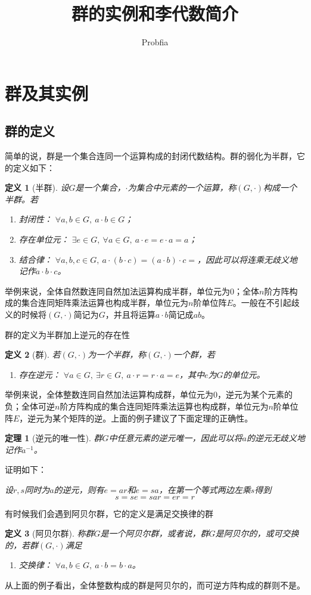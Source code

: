 \documentclass[a4paper,11pt]{ctexart}
\title{群的实例和李代数简介}
\author{Probfia}
\newcommand{\beq}{\begin{equation}}
\newcommand{\eeq}{\end{equation}}
\newcommand{\red}{\color{red}}
\newtheorem{thm}{定理}[section]
\newtheorem{dfn}{定义}[section]
\begin{document}
\maketitle
\tableofcontents

\section{群及其实例}
\subsection{群的定义}
简单的说，{\red 群是一个集合连同一个运算构成的封闭代数结构}。群的弱化为半群，它的定义如下：
\begin{dfn}[半群]
设$G$是一个集合，$\cdot$为集合中元素的一个运算，称$(G,\cdot)$构成一个半群。若
\begin{enumerate}
\item 封闭性： $\forall a,b \in G,\ a \cdot b \in G$；
\item 存在单位元： $\exists e \in G, \ \forall a \in G,\ a\cdot e = e \cdot a = a$；
\item 结合律： $\forall a,b,c \in G,\ a\cdot(b\cdot c) = (a \cdot b) \cdot c =$，因此可以将连乘无歧义地记作$a\cdot b\cdot c$。
\end{enumerate}
\end{dfn}
举例来说，全体自然数连同自然加法运算构成半群，单位元为$0$；全体$n$阶方阵构成的集合连同矩阵乘法运算也构成半群，单位元为$n$阶单位阵$E$。一般在不引起歧义的时候将$(G,\cdot)$简记为$G$，并且将运算$a \cdot b$简记成$ab$。
\par
群的定义为半群加上逆元的存在性
\begin{dfn}[群]
若$(G,\cdot)$为一个半群，称$(G,\cdot)$一个群，若
\begin{enumerate}
\item 存在逆元： $\forall a \in G,\ \exists r \in G,\ a\cdot r = r\cdot a = e$，其中$e$为$G$的单位元。
\end{enumerate}
\end{dfn}
举例来说，全体整数连同自然加法运算构成群，单位元为$0$，逆元为某个元素的负；全体可逆$n$阶方阵构成的集合连同矩阵乘法运算也构成群，单位元为$n$阶单位阵$E$，逆元为某个矩阵的逆。上面的例子建议了下面定理的正确性。
\begin{thm}[逆元的唯一性]
群$G$中任意元素的逆元唯一，因此可以将$a$的逆元无歧义地记作$a^{-1}$。
\end{thm}
证明如下：\par
\emph{设$r,s$同时为$a$的逆元，则有$e = ar$和$e = sa$，在第一个等式两边左乘$s$得到
\beq
s = se = sar = er = r
\eeq
}
\par
有时候我们会遇到阿贝尔群，它的定义是满足交换律的群
\begin{dfn}[阿贝尔群]
称群$G$是一个阿贝尔群，或者说，群$G$是阿贝尔的，或可交换的，若群$(G,\cdot)$满足
\begin{enumerate}
\item 交换律： $\forall a,b \in G,\ a\cdot b = b \cdot a$。
\end{enumerate}
\end{dfn}
从上面的例子看出，全体整数构成的群是阿贝尔的，而可逆方阵构成的群则不是。
\end{document}
